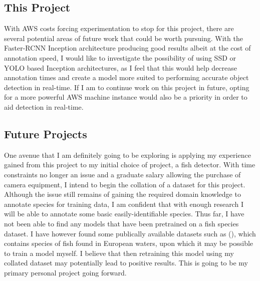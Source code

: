\documentclass[12pt]{report}
\begin{document}
\subsection{This Project}
\begin{flushleft}
With AWS costs forcing experimentation to stop for this project, there are several potential areas of future work that could be worth pursuing. With the Faster-RCNN Inception architecture producing good results albeit at the cost of annotation speed, I would like to investigate the possibility of using SSD or YOLO based Inception architectures, as I feel that this would help decrease annotation times and create a model more suited to performing accurate object detection in real-time. If I am to continue work on this project in future, opting for a more powerful AWS machine instance would also be a priority in order to aid detection in real-time.
\end{flushleft}

\subsection{Future Projects}
\begin{flushleft}
One avenue that I am definitely going to be exploring is applying my experience gained from this project to my initial choice of project, a fish detector. With time constraints no longer an issue and a graduate salary allowing the purchase of camera equipment, I intend to begin the collation of a dataset for this project. Although the issue still remains of gaining the required domain knowledge to annotate species for training data, I am confident that with enough research I will be able to annotate some basic easily-identifiable species. Thus far, I have not been able to find any models that have been pretrained on a fish species dataset. I have however found some publically available datasets such as (\cite{fish}), which contains species of fish found in European waters, upon which it may be possible to train a model myself. I believe that then retraining this model using my collated dataset may potentially lead to positive results. This is going to be my primary personal project going forward.
\end{flushleft}

\printbibliography
\end{document}
